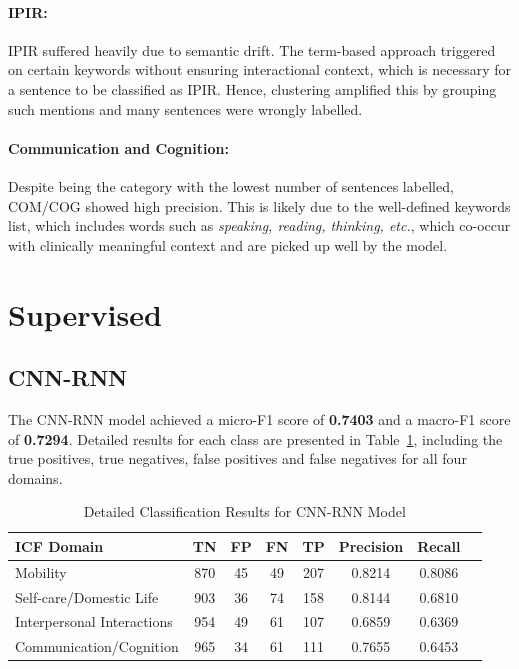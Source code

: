 \paragraph{IPIR:} IPIR suffered heavily due to semantic drift. The term-based approach triggered on certain keywords without ensuring interactional context, which is necessary for a sentence to be classified as IPIR. Hence, clustering amplified this by grouping such mentions and many sentences were wrongly labelled.

\paragraph{Communication and Cognition:} Despite being the category with the lowest number of sentences labelled, COM/COG showed high precision. This is likely due to the well-defined keywords list, which includes words such as \textit{speaking, reading, thinking, etc.}, which co-occur with clinically meaningful context and are picked up well by the model.

\vspace{1em}

\section{Supervised}

\subsection{CNN-RNN}

The CNN-RNN model achieved a micro-F1 score of \textbf{0.7403} and a macro-F1 score of \textbf{0.7294}. Detailed results for each class are presented in Table~\ref{tab:supervised-results}, including the true positives, true negatives, false positives and false negatives for all four domains.

\begin{table}[H]
\centering
\caption{Detailed Classification Results for CNN-RNN Model}
\label{tab:supervised-results}
\begin{tabular}{lccccccc}
\toprule
\textbf{ICF Domain} & \textbf{TN} & \textbf{FP} & \textbf{FN} & \textbf{TP} & \textbf{Precision} & \textbf{Recall} \\ 
\midrule
Mobility & 870 & 45 & 49 & 207 & 0.8214 & 0.8086\\[0.5ex]
Self-care/Domestic Life & 903 & 36 & 74 & 158 & 0.8144 & 0.6810\\[0.5ex]
Interpersonal Interactions & 954 & 49 & 61 & 107 & 0.6859 & 0.6369\\[0.5ex]
Communication/Cognition & 965 & 34 & 61 & 111 & 0.7655 & 0.6453\\ 
\bottomrule
\end{tabular}
\end{table}

